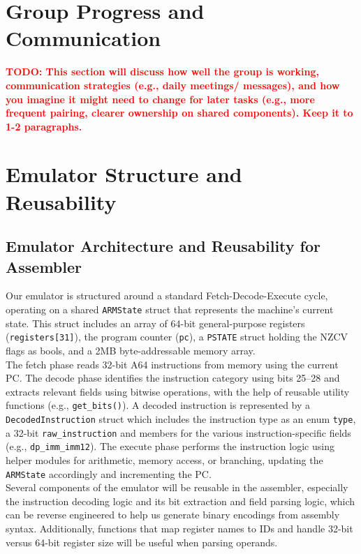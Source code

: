 \documentclass[11pt,a4paper]{article} %
\newcommand{\todo}[1]{\textcolor{red}{\textbf{TODO: #1}}}
\begin{document}
\section{Group Progress and Communication}
\label{sec:group-progress}
\todo{This section will discuss how well the group is working, communication strategies (e.g., daily meetings/ messages), and how you imagine it might need to change for later tasks (e.g., more frequent pairing, clearer ownership on shared components). Keep it to 1-2 paragraphs.}

\section{Emulator Structure and Reusability}
\label{sec:emulator-structure}
\subsection*{Emulator Architecture and Reusability for Assembler}

Our emulator is structured around a standard Fetch-Decode-Execute cycle, operating on a shared \texttt{ARMState} struct that represents the machine's current state. This struct includes an array of 64-bit general-purpose registers (\texttt{registers[31]}), the program counter (\texttt{pc}), a \texttt{PSTATE} struct holding the NZCV flags as bools, and a 2MB byte-addressable memory array.\\

The fetch phase reads 32-bit A64 instructions from memory using the current PC. The decode phase identifies the instruction category using bits 25–28 and extracts relevant fields using bitwise operations, with the help of reusable utility functions (e.g., \texttt{get\_bits()}). A decoded instruction is represented by a \texttt{DecodedInstruction} struct which includes the instruction type as an enum \texttt{type}, a 32-bit \texttt{raw\_instruction} and members for the various instruction-specific fields (e.g., \texttt{dp\_imm\_imm12}). The execute phase performs the instruction logic using helper modules for arithmetic, memory access, or branching, updating the \texttt{ARMState} accordingly and incrementing the PC.\\

Several components of the emulator will be reusable in the assembler, especially the instruction decoding logic and its bit extraction and field parsing logic, which can be reverse engineered to help us generate binary encodings from assembly syntax. Additionally, functions that map register names to IDs and handle 32-bit versus 64-bit register size will be useful when parsing operands.
\end{document}
